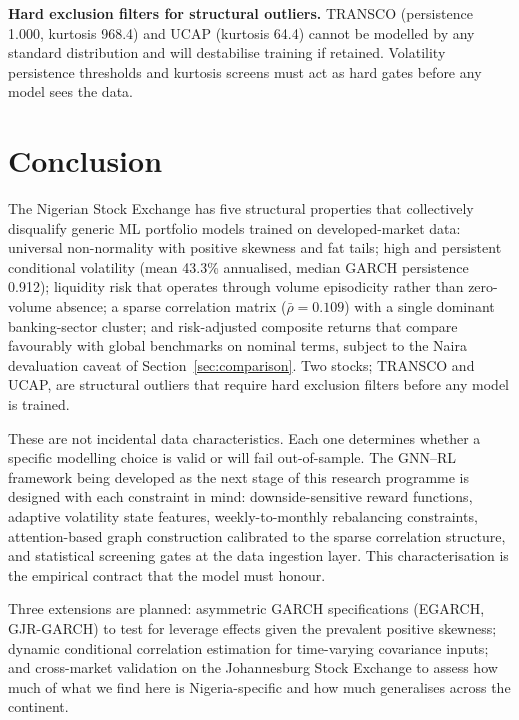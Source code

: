\documentclass[twoside,11pt]{article}
\begin{document}
	\textbf{Hard exclusion filters for structural outliers.} TRANSCO	(persistence 1.000, kurtosis 968.4) and UCAP (kurtosis 64.4) cannot	be modelled by any standard distribution and will destabilise training if retained. Volatility persistence thresholds and kurtosis screens
	must act as hard gates before any model sees the data.
	
	\section{Conclusion}
	\label{sec:conclusion}
	
	The Nigerian Stock Exchange has five structural properties that collectively disqualify generic ML portfolio models trained on	developed-market data: universal non-normality with positive skewness and fat tails; high and persistent conditional volatility (mean 43.3\% annualised, median GARCH persistence 0.912); liquidity risk that	operates through volume episodicity rather than zero-volume absence; a sparse correlation matrix ($\bar{\rho} = 0.109$) with a single	dominant banking-sector cluster; and risk-adjusted composite returns	that compare favourably with global benchmarks on nominal terms, subject to the Naira devaluation caveat of Section~\ref{sec:comparison}. Two stocks; TRANSCO and UCAP, are structural outliers that require hard exclusion filters before any model is trained.
	
	These are not incidental data characteristics. Each one determines whether a specific modelling choice is valid or will fail out-of-sample. The GNN--RL framework being developed as the next stage of this research programme is designed with each constraint in mind: downside-sensitive reward functions, adaptive volatility state features, weekly-to-monthly rebalancing constraints, attention-based graph construction calibrated to the sparse correlation structure, and statistical screening gates at the data ingestion layer. This characterisation is the empirical contract that the model must honour.
	
	Three extensions are planned: asymmetric GARCH specifications (EGARCH, GJR-GARCH) to test for leverage effects given the prevalent positive skewness; dynamic conditional correlation estimation for time-varying covariance inputs; and cross-market validation on the Johannesburg Stock Exchange to assess how much
	of what we find here is Nigeria-specific and how much generalises across the continent.
	
\end{document}
